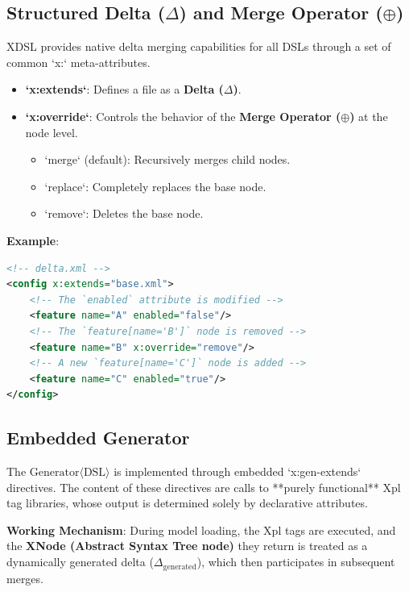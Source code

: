 \documentclass[11pt]{article}
\begin{document}
\subsection{Structured Delta ($\Delta$) and Merge Operator ($\oplus$)}
XDSL provides native delta merging capabilities for all DSLs through a set of common `x:` meta-attributes.
\begin{itemize}
    \item \textbf{`x:extends`}: Defines a file as a \textbf{Delta ($\Delta$)}.
    \item \textbf{`x:override`}: Controls the behavior of the \textbf{Merge Operator ($\oplus$)} at the node level.
        \begin{itemize}
            \item `merge` (default): Recursively merges child nodes.
            \item `replace`: Completely replaces the base node.
            \item `remove`: Deletes the base node.
        \end{itemize}
\end{itemize}
\textbf{Example}:
\begin{lstlisting}[language=XML, caption={Delta model using XDSL attributes}]
<!-- delta.xml -->
<config x:extends="base.xml">
    <!-- The `enabled` attribute is modified -->
    <feature name="A" enabled="false"/>
    <!-- The `feature[name='B']` node is removed -->
    <feature name="B" x:override="remove"/>
    <!-- A new `feature[name='C']` node is added -->
    <feature name="C" enabled="true"/>
</config>
\end{lstlisting}

\subsection{Embedded Generator}
The $\text{Generator}\langle\text{DSL}\rangle$ is implemented through embedded `x:gen-extends` directives. The content of these directives are calls to **purely functional** Xpl tag libraries, whose output is determined solely by declarative attributes.

\textbf{Working Mechanism}: During model loading, the Xpl tags are executed, and the \textbf{XNode (Abstract Syntax Tree node)} they return is treated as a dynamically generated delta ($\Delta_{\text{generated}}$), which then participates in subsequent merges.
\end{document}

